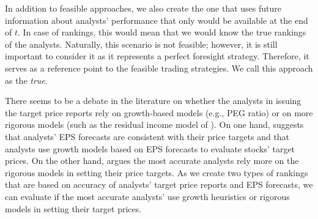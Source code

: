 \documentclass{article}\usepackage[]{graphicx}\usepackage[]{color}
\newcommand{\tr}{\textit{true}}
\newcommand{\naive}{\textit{recent}}
\newcommand{\default}{\textit{all-time}}
\begin{document}
In addition to feasible approaches, we also create the one that uses future information about analysts' performance that only would be available at the end of $t$. In case of rankings, this would mean that we would know the true rankings of the analysts. Naturally, this scenario is not feasible; however, it is still important to consider it as it represents a perfect foresight strategy. Therefore, it serves as a reference point to the feasible trading strategies. We call this approach as the \tr{}. 


There seems to be a debate in the literature on whether the analysts in issuing the target price reports rely on growth-based models (e.g., PEG ratio) or on more rigorous models (such as the residual income model of \cite{ohlson1995}). On one hand, \cite{bradshaw2004} suggests that analysts' EPS forecasts are consistent with their price targets and that analysts use growth models based on EPS forecasts to evaluate stocks' target prices. On the other hand, \cite{simon2011} argues the most accurate analysts rely more on the rigorous models in setting their price targets. As we create two types of rankings that are based on accuracy of analysts' target price reports and  EPS forecasts, we can evaluate if the most accurate analysts' use growth heuristics or rigorous models in setting their target prices.




\end{document}

